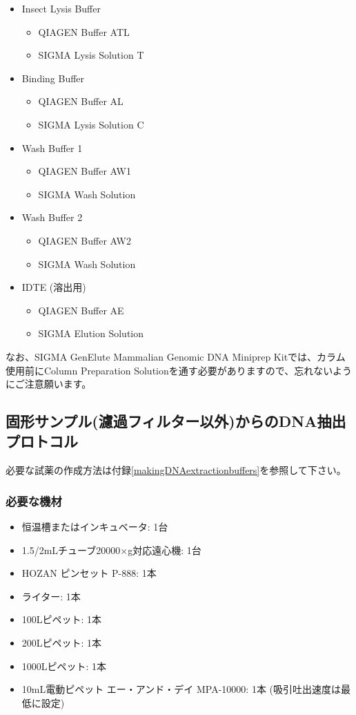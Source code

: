 \documentclass[titlepage,10pt,a4paper,uplatex]{jsbook}
\begin{document}
\begin{itemize}
\item Insect Lysis Buffer
\begin{itemize}
\item QIAGEN Buffer ATL
\item SIGMA Lysis Solution T
\end{itemize}
\item Binding Buffer
\begin{itemize}
\item QIAGEN Buffer AL
\item SIGMA Lysis Solution C
\end{itemize}
\item Wash Buffer 1
\begin{itemize}
\item QIAGEN Buffer AW1
\item SIGMA Wash Solution
\end{itemize}
\item Wash Buffer 2
\begin{itemize}
\item QIAGEN Buffer AW2
\item SIGMA Wash Solution
\end{itemize}
\item IDTE (溶出用)
\begin{itemize}
\item QIAGEN Buffer AE
\item SIGMA Elution Solution
\end{itemize}
\end{itemize}

なお、SIGMA GenElute Mammalian Genomic DNA Miniprep Kitでは、カラム使用前にColumn Preparation Solutionを通す必要がありますので、忘れないようにご注意願います。

\subsection{固形サンプル(濾過フィルター以外)からのDNA抽出プロトコル}

必要な試薬の作成方法は付録\ref{makingDNAextractionbuffers}を参照して下さい。

\subsubsection{必要な機材}
\begin{itemize}
\item 恒温槽またはインキュベータ: 1台
\item 1.5/2mLチューブ20000×g対応遠心機: 1台
\item HOZAN ピンセット P-888: 1本
\item ライター: 1本
\item 100{\textmu}Lピペット: 1本
\item 200{\textmu}Lピペット: 1本
\item 1000{\textmu}Lピペット: 1本
\item 10mL電動ピペット エー・アンド・デイ MPA-10000: 1本 (吸引吐出速度は最低に設定)
\end{itemize}
\end{document}
